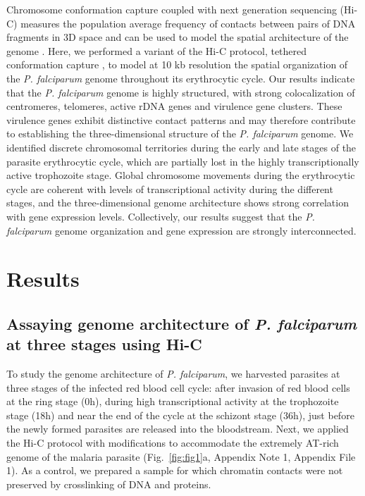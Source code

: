 Chromosome conformation capture coupled with next generation sequencing (Hi-C)
measures the population average frequency of contacts between pairs of DNA
fragments in 3D space and can be used to model the spatial architecture of the
genome \citep{lieberman-aiden:comprehensive, duan:three, kalhor:genome}. Here,
we performed a variant of the Hi-C protocol, tethered conformation capture
\citep{kalhor:genome}, to model at 10 kb resolution the spatial organization
of the {\em P. falciparum} genome throughout its erythrocytic cycle. Our
results indicate that the {\em P. falciparum} genome is highly structured,
with strong colocalization of centromeres, telomeres, active rDNA genes and
virulence gene clusters. These virulence genes exhibit distinctive contact
patterns and may therefore contribute to establishing the three-dimensional
structure of the {\em P. falciparum} genome. We identified discrete
chromosomal territories during the early and late stages of the parasite
erythrocytic cycle, which are partially lost in the highly transcriptionally
active trophozoite stage. Global chromosome movements during the erythrocytic
cycle are coherent with levels of transcriptional activity during the
different stages, and the three-dimensional genome architecture shows strong
correlation with gene expression levels. Collectively, our results suggest
that the {\em P. falciparum} genome organization and gene expression are
strongly interconnected.

\section{Results}

\subsection{Assaying genome architecture of {\em P. falciparum} at three stages using Hi-C}

To study the genome architecture of {\em P. falciparum}, we harvested
parasites at three stages of the infected red blood cell cycle: after invasion
of red blood cells at the ring stage (0h), during high transcriptional
activity at the trophozoite stage (18h) and near the end of the cycle at the
schizont stage (36h), just before the newly formed parasites are released into
the bloodstream. Next, we applied the Hi-C protocol \citep{kalhor:genome} with
modifications to accommodate the extremely AT-rich genome of the malaria
parasite (Fig.~\ref{fig:fig1}a, Appendix Note 1, Appendix File 1).
As a control, we prepared a sample for which chromatin contacts were not
preserved by crosslinking of DNA and proteins.

